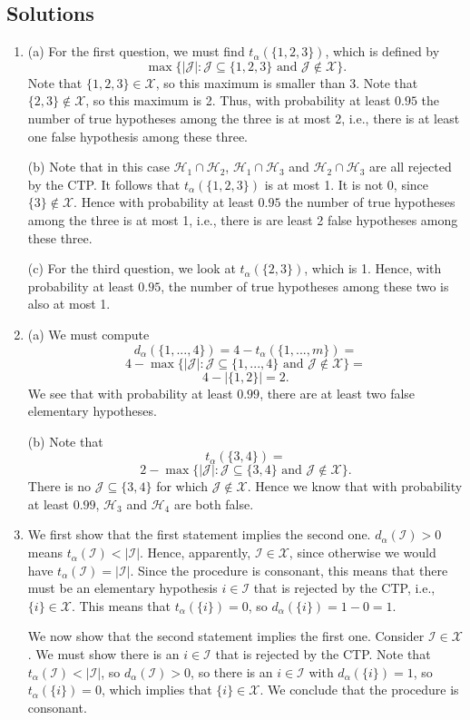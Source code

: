 \documentclass[11pt]{article}
\theoremstyle{plain}
\theoremstyle{definition}
\newcommand{\I}{\mathcal{I}}
\newcommand{\J}{\mathcal{J}}
\newcommand{\X}{\mathcal{X}}
\newcommand{\Hy}{\mathcal{H}}
\newcommand{\red}{\color{red}}
\newcommand{\black}{\color{black}}
\begin{document}

\begin{sols}
\subsection{Solutions}
\begin{enumerate}
\item (a) For the first question, we must find $t_{\alpha}(\{1,2,3\})$, which is defined by 
$$\max\{|\J|: \J \subseteq \{1,2,3\} \text{ and }  \J\not\in \X\}.$$
Note that $\{1,2,3\}\in \X$, so this maximum is smaller than 3. Note that  $\{2,3\}\not\in \X$, so this maximum is 2. Thus,  with probability at least $0.95$ the number of true hypotheses among the three is at most 2, i.e., there is at least one false hypothesis among these three.

(b)  Note that in this case $\Hy_1\cap\Hy_2$, $\Hy_1\cap\Hy_3$ and $\Hy_2\cap\Hy_3$ are all rejected by the CTP. It follows that $t_{\alpha}(\{1,2,3\})$ is at most 1. It is not 0, since  $\{3\}\not\in \X$. Hence 
with probability at least $0.95$ the number of true hypotheses among the three is at most 1, i.e., there is are least 2 false hypotheses among these three.

(c) For the third question, we look at $t_{\alpha}(\{2,3\})$, which is 1. Hence, with probability at least $0.95$, the number of true hypotheses among these two is also at most 1.

\item (a) 
We must compute $$d_{\alpha}(\{1,...,4\})= 4- t_{\alpha}(\{1,...,m\})=$$
$$4-\max\{|\J|: \J \subseteq \{1,...,4\} \text{ and }  \J\not \in \X\}=$$
$$4-|\{1,2\}|=2.$$
We see that with probability at least $0.99$, there are at least two false elementary hypotheses.

(b)
Note that $$t_{\alpha}(\{3,4\})=$$
$$2-\max\{|\J|: \J \subseteq \{3,4\} \text{ and }  \J\not \in \X\}.$$
There is no $\J \subseteq \{3,4\}$ for which $\J\not \in \X$. Hence we know that with probability at least $0.99$,  $\Hy_3$ and $\Hy_4$ are both false.



\item 
We first show that the first statement implies the second one.
$d_{\alpha}(\I)>0$ means $t_{\alpha}(\I)<|\I|$. Hence, apparently, $\I\in \X$, since otherwise we would have $t_{\alpha}(\I)=|\I|$. Since the procedure is consonant, this means that there must be an elementary hypothesis $i\in \I$ that is rejected by the CTP, i.e., $\{i\}\in \X$. This means that $t_{\alpha}(\{i\})=0$, so $d_{\alpha}(\{i\})=1-0=1.$

We now show that the second statement implies the first one. Consider $\I\in \X$. We must show there is an $i\in \I$ that is rejected by the CTP. Note that $t_{\alpha}(\I)<|\I|$, so $d_{\alpha}(\I)>0$, so there is an $i\in \I$ with $d_{\alpha}(\{i\})=1$, so $t_{\alpha}(\{i\})=0$, which implies that  $\{i\}\in \X$. We conclude that the procedure is consonant.



\end{enumerate}

\end{sols}
\end{document}
